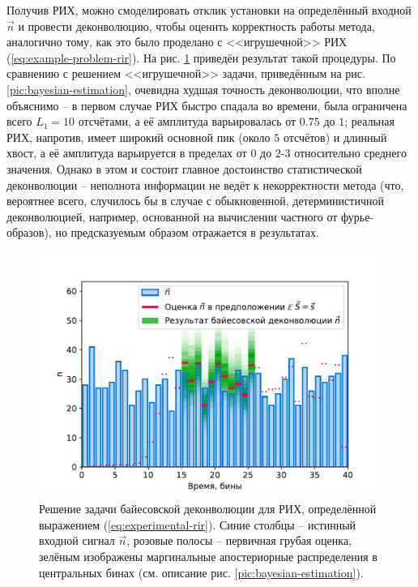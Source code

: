 \documentclass[12pt]{book}
\begin{document}
	Получив РИХ, можно смоделировать отклик установки на определённый входной $\vec{n}$ и провести деконволюцию, чтобы оценить корректность работы метода, аналогично тому, как это было проделано с <<игрушечной>> РИХ (\ref{eq:example-problem-rir}). На рис. \ref{pic:bayesian-deconvolution-with-experimantal-rir} приведён результат такой процедуры. По сравнению с решением <<игрушечной>> задачи, приведённым на рис. \ref{pic:bayesian-estimation}, очевидна худшая точность деконволюции, что вполне объяснимо -- в первом случае РИХ быстро спадала во времени, была ограничена всего $L_1=10$ отсчётами, а её амплитуда варьировалась от $0.75$ до $1$; реальная РИХ, напротив, имеет широкий основной пик (около $5$ отсчётов) и длинный хвост, а её амплитуда варьируется в пределах от $0$ до $2$-$3$  относительно среднего значения. Однако в этом и состоит главное достоинство статистической деконволюции -- неполнота информации не ведёт к некорректности метода (что, вероятнее всего, случилось бы в случае с обыкновенной, детерминистичной деконволюцией, например, основанной на вычислении частного от фурье-образов), но предсказуемым образом отражается в результатах.
	
	\begin{figure}
		\centering
		\includegraphics[width=\columnwidth]{bayesian-deconvolution-with-experimantal-rir}
		\caption{Решение задачи байесовской деконволюции для РИХ, определённой выражением (\ref{eq:experimental-rir}). Синие столбцы -- истинный входной сигнал $\vec{n}$, розовые полосы -- первичная грубая оценка, зелёным изображены маргинальные апостериорные распределения в центральных бинах (см. описание рис. \ref{pic:bayesian-estimation}).}
		\label{pic:bayesian-deconvolution-with-experimantal-rir}
	\end{figure}
\end{document}
